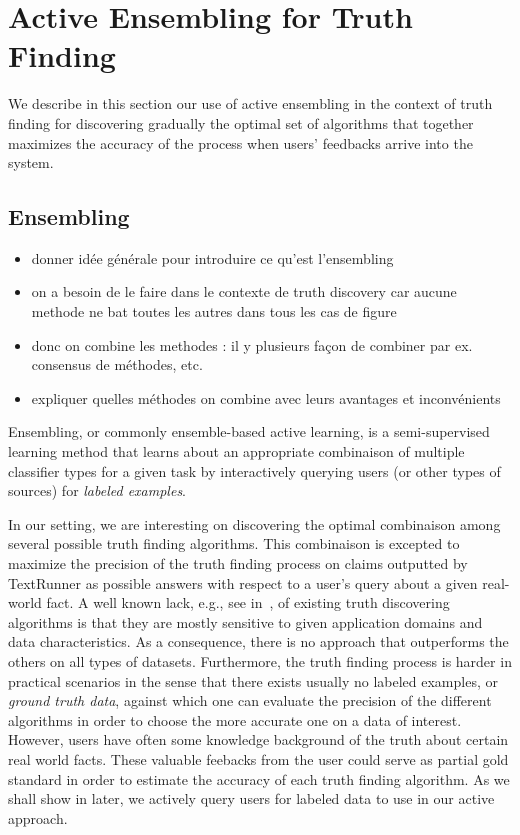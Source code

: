 \section{Active Ensembling for Truth Finding}
We describe in this section our use of active ensembling in the context of truth finding
for discovering gradually the optimal set of algorithms that together maximizes the accuracy
of the process when users' feedbacks arrive into the system.

\subsection{Ensembling }
\begin{itemize}
\item donner idée générale pour introduire  ce qu'est l'ensembling
\item on a besoin de le faire dans le contexte de truth discovery car aucune methode ne bat toutes les autres dans tous les cas de figure
\item donc on combine les methodes : il y plusieurs façon de combiner par ex. consensus de méthodes, etc.
\item expliquer quelles méthodes on combine avec leurs avantages et inconvénients
\end{itemize}


Ensembling, or commonly ensemble-based active learning, is a semi-supervised learning method that learns
about an appropriate combinaison of multiple classifier types for a given task by interactively querying users (or other types of sources)
for \emph{labeled examples}. 

In our setting, we are interesting on discovering the optimal combinaison among several possible truth finding algorithms.
This combinaison is excepted to maximize the precision of the truth finding process on claims outputted by TextRunner as 
possible answers with respect to a user's query about a given real-world fact.
A well known lack, e.g., see in~\cite{Li12, Wagui14}, of existing truth discovering algorithms is that they are mostly sensitive
to given application domains and data characteristics. As a consequence, there is no approach that outperforms the others on all 
types of datasets. Furthermore, the truth finding process is harder in practical scenarios in the sense that there exists usually 
no labeled examples, or \emph{ground truth data}, against which one can evaluate the precision of the different algorithms in order to choose
the more accurate one on a data of interest. However, users have often
some knowledge background of the truth about certain real world facts. These valuable feebacks from the user could serve as partial gold 
standard in order to estimate the accuracy of each truth finding algorithm.  As we shall show in later, we actively query users for labeled
data to use in our active approach.


